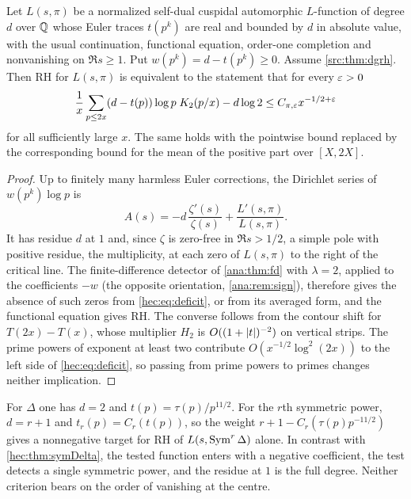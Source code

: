 \begin{theorem}\label{hec:thm:deficit}
Let $L(s,\pi)$ be a normalized self-dual cuspidal automorphic $L$-function of degree $d$ over $\mathbb{Q}$ whose
Euler traces $t(p^k)$ are real and bounded by $d$ in absolute value, with the usual continuation,
functional equation, order-one completion and nonvanishing on $\Re s\ge1$. Put $w(p^k)=d-t(p^k)\ge0$.
Assume \cref{src:thm:dgrh}. Then RH for $L(s,\pi)$ is equivalent to the statement that for every $\varepsilon>0$
\begin{equation}\label{hec:eq:deficit}
 \frac1x\sum_{p\le2x}(d-t(p))\log p\;K_2(p/x)-d\log2\le C_{\pi,\varepsilon}x^{-1/2+\varepsilon}
\end{equation}
for all sufficiently large $x$. The same holds with the pointwise bound replaced by the corresponding
bound for the mean of the positive part over $[X,2X]$.
\end{theorem}

\begin{proof}
Up to finitely many harmless Euler corrections, the Dirichlet series of $w(p^k)\log p$ is
\[
 A(s)=-d\,\frac{\zeta'(s)}{\zeta(s)}+\frac{L'(s,\pi)}{L(s,\pi)} .
\]
It has residue $d$ at $1$ and, since $\zeta$ is zero-free in $\Re s>1/2$, a simple pole with positive
residue, the multiplicity, at each zero of $L(s,\pi)$ to the right of the critical line. The
finite-difference detector of \cref{ana:thm:fd} with $\lambda=2$, applied to the coefficients $-w$ (the
opposite orientation, \cref{ana:rem:sign}), therefore gives the absence of such zeros from
\eqref{hec:eq:deficit}, or from its averaged form, and the functional equation gives RH. The converse
follows from the contour shift for $T(2x)-T(x)$, whose multiplier $H_2$ is $O((1+\lvert t\rvert)^{-2})$ on vertical
strips. The prime powers of exponent at least two contribute $O(x^{-1/2}\log^2(2x))$ to the left side of
\eqref{hec:eq:deficit}, so passing from prime powers to primes changes neither implication.
\end{proof}

For $\Delta$ one has $d=2$ and $t(p)=\tau(p)/p^{11/2}$. For the $r$th symmetric power, $d=r+1$ and
$t_r(p)=C_r(t(p))$, so the weight $r+1-C_r(\tau(p)p^{-11/2})$ gives a nonnegative target for RH of
$L(s,\operatorname{Sym}^r\Delta)$ alone. In contrast with \cref{hec:thm:symDelta}, the tested function enters with a
negative coefficient, the test detects a single symmetric power, and the residue at $1$ is the full degree.
Neither criterion bears on the order of vanishing at the centre.

